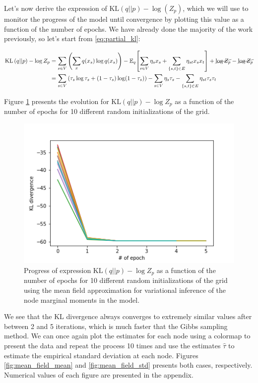 \documentclass[11pt]{article}
\newcommand{\Expect}[2][]{\mathbb{E}_{#1}\!\left[#2 \right]}
\newcommand{\KL}[1]{\mathrm{KL}\left( #1 \right)}
\begin{document}
\begin{description}
Let's now derive the expression of $\KL{q||p} - \log(Z_p)$, which we will use to monitor the progress of the model until convergence by plotting this value as a function of the number of epochs. We have already done the majority of the work previously, so let's start from \ref{eq:partial_kl}:

\clearpage

\begin{align*}
\KL{q||p} - \log Z_p & = \sum_{s \in V} \left( \sum_{x} q(x_s)\log q(x_s) \right) - \Expect[q]{\sum_{s \in V} \eta_s x_s + \sum_{\{s,t\} \in E} \eta_{st} x_s x_t} + \cancel{\log Z_p} - \cancel{\log Z_p} \\
					 & = \sum_{s \in V} \left(\tau_s \log \tau_s + (1-\tau_s)\log(1-\tau_s) \right) - \sum_{s \in V} \eta_s \tau_s - \sum_{\{s,t\} \in E} \eta_{st} \tau_s \tau_t
\end{align*}

Figure \ref{fig:kl_mean_field} presents the evolution for $\KL{q||p} - \log Z_p$ as a function of the number of epochs for 10 different random initializations of the grid.

\begin{figure}[htbp]
\begin{center}
\includegraphics[scale=0.75]{figures/kl_div_mean_field.png}
\caption{Progress of expression $\KL{q||p} - \log Z_p$ as a function of the number of epochs for 10 different random initializations of the grid using the mean field approximation for variational inference of the node marginal moments in the model.}
\label{fig:kl_mean_field}
\end{center}
\end{figure}

We see that the KL divergence always converges to extremely similar values after between 2 and 5 iterations, which is much faster that the Gibbs sampling method. We can once again plot the estimates for each node using a colormap to present the data and repeat the process 10 times and use the estimates $\hat{\tau}$ to estimate the empirical standard deviation at each node. Figures \ref{fig:mean_field_mean} and \ref{fig:mean_field_std} presents both cases, respectively. Numerical values of each figure are presented in the appendix.


\end{description}
\end{document}
